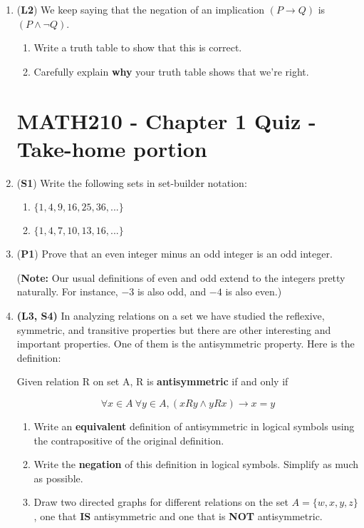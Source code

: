 \documentclass[12pt]{article}
\begin{document}
\begin{enumerate}
\begin{enumerate}
\end{enumerate}

\item (\textbf{L2}) We keep saying that the negation of an implication $(P \to Q)$ is $(P \land \lnot Q)$.
\begin{enumerate}
    \item Write a truth table to show that this is correct.
    
    \item Carefully explain \textbf{why} your truth table shows that we're right.
    
\end{enumerate}

\pagebreak

\section*{MATH210 - Chapter 1 Quiz - Take-home portion}

\item (\textbf{S1}) Write the following sets in set-builder notation:

\begin{enumerate}
    \item $\{1, 4, 9, 16, 25, 36, ... \}$ \\
    \item $\{1, 4, 7, 10, 13, 16, ... \}$ \\
\end{enumerate}

\item (\textbf{P1}) Prove that an even integer minus an odd integer is an odd integer.

(\textbf{Note:} Our usual definitions of even and odd extend to the integers pretty naturally. For instance, $-3$ is also odd, and $-4$ is also even.)


\item
\textbf{(L3, S4)} In analyzing relations on a set we have studied the reflexive, symmetric, and transitive properties but there are other interesting and important properties. One of them is the antisymmetric property. Here is the definition:

Given relation R on set A, R is \textbf{antisymmetric} if and only if 

		\[\forall x \in A\ \forall y \in A, (xRy \land yRx) \rightarrow x = y \]

\begin{enumerate}
    \item Write an \textbf{equivalent} definition of antisymmetric in logical symbols using the contrapositive of the original definition. \\
	\item Write the \textbf{negation} of this definition in logical symbols. Simplify as much as possible. \\
	\item Draw two directed graphs for different relations on the set $A=\{w,x,y,z\}$, one that \textbf{IS} antisymmetric and one that is \textbf{NOT} antisymmetric.
\end{enumerate}


\end{enumerate}
\end{document}

